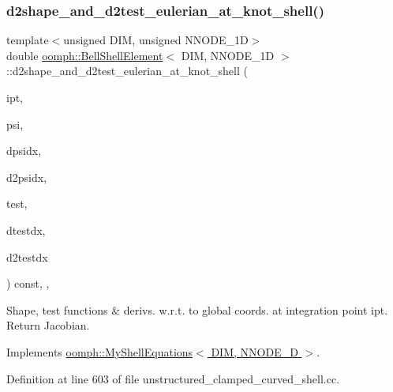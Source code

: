 \subsubsection{\texorpdfstring{d2shape\+\_\+and\+\_\+d2test\+\_\+eulerian\+\_\+at\+\_\+knot\+\_\+shell()}{d2shape\_and\_d2test\_eulerian\_at\_knot\_shell()}}
{\footnotesize\ttfamily template$<$unsigned D\+IM, unsigned N\+N\+O\+D\+E\+\_\+1D$>$ \\
double \hyperlink{classoomph_1_1BellShellElement}{oomph\+::\+Bell\+Shell\+Element}$<$ D\+IM, N\+N\+O\+D\+E\+\_\+1D $>$\+::d2shape\+\_\+and\+\_\+d2test\+\_\+eulerian\+\_\+at\+\_\+knot\+\_\+shell (\begin{DoxyParamCaption}\item[{const unsigned \&}]{ipt,  }\item[{Shape \&}]{psi,  }\item[{D\+Shape \&}]{dpsidx,  }\item[{D\+Shape \&}]{d2psidx,  }\item[{Shape \&}]{test,  }\item[{D\+Shape \&}]{dtestdx,  }\item[{D\+Shape \&}]{d2testdx }\end{DoxyParamCaption}) const\hspace{0.3cm}{\ttfamily [inline]}, {\ttfamily [protected]}, {\ttfamily [virtual]}}



Shape, test functions \& derivs. w.\+r.\+t. to global coords. at integration point ipt. Return Jacobian. 



Implements \hyperlink{classoomph_1_1MyShellEquations_af8f15f0d678c85535bbc3390399dafdd}{oomph\+::\+My\+Shell\+Equations$<$ D\+I\+M, N\+N\+O\+D\+E\+\_\+D $>$}.



Definition at line 603 of file unstructured\+\_\+clamped\+\_\+curved\+\_\+shell.\+cc.

\mbox{\label{classoomph_1_1BellShellElement_ace76c40d2ccff50c50140cb27ef9e6f6}} 
